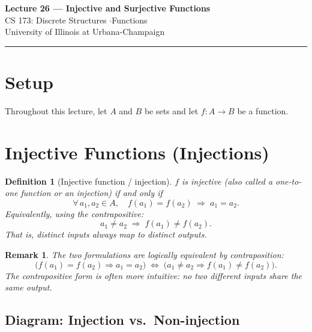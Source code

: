 \documentclass[11pt]{article}
\theoremstyle{defstyle}
\newtheorem{definition}{Definition}[section]
\theoremstyle{thmstyle}
\theoremstyle{notstyle}
\newtheorem*{remark}{Remark}
\theoremstyle{cautionstyle}
\begin{document}
\begin{center}
  {\Large\bfseries Lecture 26 --- Injective and Surjective Functions}\\[4pt]
  {\normalsize CS 173: Discrete Structures \quad$\cdot$\quad Functions}\\[2pt]
  {\small\color{gray} University of Illinois at Urbana-Champaign}
\end{center}

\vspace{1em}
\hrule
\vspace{1.5em}

\section{Setup}

Throughout this lecture, let $A$ and $B$ be sets and let $f : A \to B$ be a function.

\section{Injective Functions (Injections)}

\begin{defbox}
\begin{definition}[Injective function / injection]
$f$ is \emph{injective} (also called a \emph{one-to-one function} or an \emph{injection}) if and only if
\[
  \forall\, a_1, a_2 \in A,\quad f(a_1) = f(a_2) \;\Rightarrow\; a_1 = a_2.
\]
Equivalently, using the contrapositive:
\[
  a_1 \neq a_2 \;\Rightarrow\; f(a_1) \neq f(a_2).
\]
That is, distinct inputs always map to distinct outputs.
\end{definition}
\end{defbox}

\begin{notebox}
\begin{remark}
The two formulations are logically equivalent by contraposition:
\[
  \bigl(f(a_1) = f(a_2) \Rightarrow a_1 = a_2\bigr)
  \;\iff\;
  \bigl(a_1 \neq a_2 \Rightarrow f(a_1) \neq f(a_2)\bigr).
\]
The contrapositive form is often more intuitive: no two different inputs share the same output.
\end{remark}
\end{notebox}

\subsection*{Diagram: Injection vs.\ Non-injection}
\end{document}
